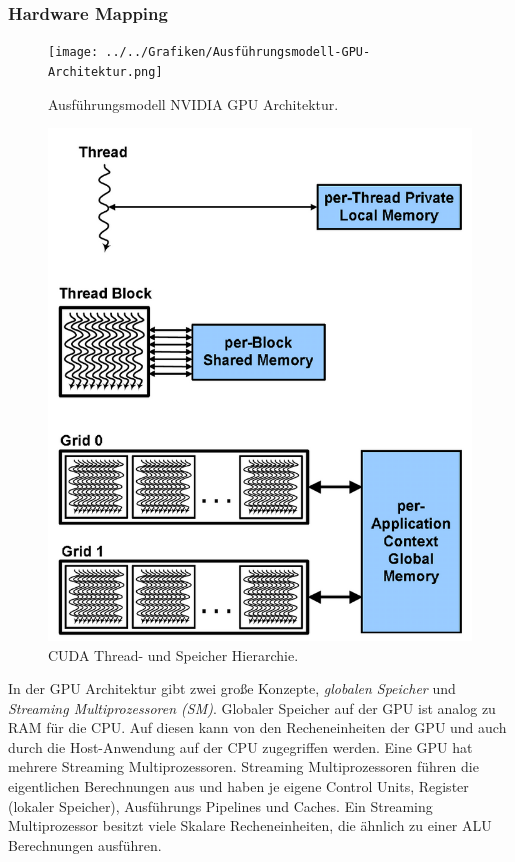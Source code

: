 \subsubsection*{Hardware Mapping}
\begin{figure}[]
	\centering
	\begin{minipage}[b]{0.49\textwidth}
		\centering
		\texttt{[image: ../../Grafiken/Ausführungsmodell-GPU-Architektur.png]}
		\caption{Ausführungsmodell NVIDIA GPU Architektur. \cite{Larkin2016}}
		\label{fig::ga04}
	\end{minipage}
	\hfill
	\begin{minipage}[b]{0.49\textwidth}
		\centering
		\includegraphics[width=1\textwidth]{../../Grafiken/GPU-Memory-Hierarchie-with-Threads.PNG}
		\caption{CUDA Thread- und Speicher Hierarchie. \cite{NVIDIA}}
		\label{fig::ga05}
	\end{minipage}
\end{figure}

In der GPU Architektur gibt zwei große Konzepte, \emph{globalen Speicher} und \emph{Streaming Multiprozessoren (SM)}.
Globaler Speicher auf der GPU ist analog zu RAM für die CPU.
Auf diesen kann von den Recheneinheiten der GPU und auch durch die Host-Anwendung auf der CPU zugegriffen werden. 
Eine GPU hat mehrere Streaming Multiprozessoren.
Streaming Multiprozessoren führen die eigentlichen Berechnungen aus und haben je eigene Control Units, Register (lokaler Speicher), Ausführungs Pipelines und Caches.
Ein Streaming Multiprozessor besitzt viele Skalare Recheneinheiten, die ähnlich zu einer ALU Berechnungen ausführen.

